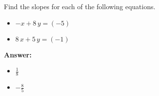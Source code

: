  Find the slopes for each of the following equations. \begin{itemize}\item \( -x + 8 \, y = \left(-5\right) \)\item \( 8 \, x + 5 \, y = \left(-1\right) \)\end{itemize}

        \textbf{Answer:} \begin{itemize}\item \( \frac{1}{8} \)\item \( -\frac{8}{5} \)\end{itemize}
